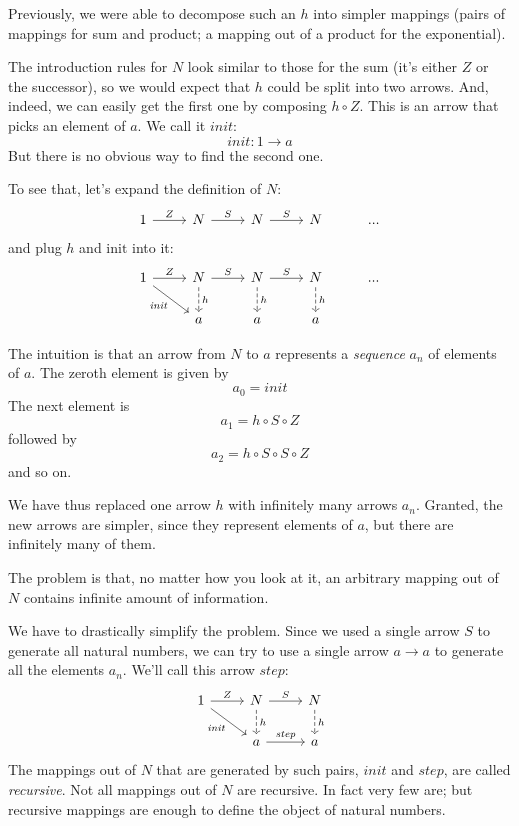 \documentclass[DaoFP]{subfiles}
\begin{document}
Previously, we were able to decompose such an $h$ into simpler mappings (pairs of mappings for sum and product; a mapping out of a product for the exponential). 

The introduction rules for $N$ look similar to those for the sum (it's either $Z$ or the successor), so we would expect that $h$ could be split into two arrows. And, indeed, we can easily get the first one by composing $h \circ Z$. This is an arrow that picks an element of $a$. We call it $\mathit{init}$:
\[\mathit{init} \colon 1 \to a \]
But there is no obvious way to find the second one. 


To see that, let's expand the definition of $N$:
\[
 \begin{tikzcd}
 1
 \arrow[r, "Z"]
 &N
  \arrow[r, "S"]
&N
  \arrow[r, "S"]
&N
& ...
  \end{tikzcd}
\]
and plug $h$ and $\text{init}$ into it:
\[
 \begin{tikzcd}
 1
 \arrow[r, "Z"]
 \arrow[rd, "\mathit{init}"']
 &N
  \arrow[r, "S"]
\arrow[d, dashed, "h"]
&N
  \arrow[r, "S"]
\arrow[d, dashed, "h"]
&N
\arrow[d, dashed, "h"]
& ...
\\
& a
& a
& a
  \end{tikzcd}
\]

The intuition is that an arrow from $N$ to $a$ represents a \emph{sequence} $a_n$ of elements of $a$. The zeroth element is given by 
\[a_0=\mathit{init}\]
The next element is
\[a_1 = h \circ S \circ Z \]
followed by
\[a_2 = h \circ S \circ S \circ Z \]
and so on.

We have thus replaced one arrow $h$ with infinitely many arrows $a_n$. Granted, the new arrows are simpler, since they represent elements of $a$, but there are infinitely many of them. 

The problem is that, no matter how you look at it, an arbitrary mapping out of $N$ contains infinite amount of information.

We have to drastically simplify the problem. Since we used a single arrow $S$ to generate all natural numbers, we can try to use a single arrow $a \to a$ to generate all the elements $a_n$. We'll call this arrow $\mathit{step}$:
\[
 \begin{tikzcd}
 1
 \arrow[r, "Z"]
 \arrow[rd, "\mathit{init}"']
 &N
  \arrow[r, "S"]
\arrow[d, dashed, "h"]
&N
\arrow[d, dashed, "h"]
\\
& a
\arrow[r, "\mathit{step}"]
& a
  \end{tikzcd}
\]
The mappings out of $N$ that are generated by such pairs, $\mathit{init}$ and $\mathit{step}$, are called \emph{recursive}. Not all mappings out of $N$ are recursive. In fact very few are; but recursive mappings are enough to define the object of natural numbers. 
\end{document}
